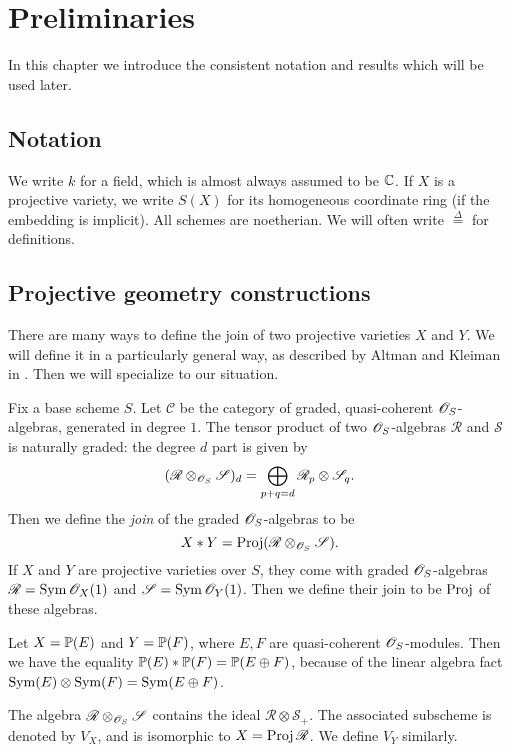 \chapter{Preliminaries}
\label{sec:prelims}

In this chapter we introduce the consistent notation and results which will be used later.


\section{Notation}

We write $k$ for a field, which is almost always assumed to be $\C$. If $X$ is a projective variety, we write $S(X)$ for its homogeneous coordinate ring (if the embedding is implicit). All schemes are noetherian. We will often write $\stackrel \Delta = $ for definitions.

\section{Projective geometry constructions}

There are many ways to define the join of two projective varieties $X$ and $Y$. We will define it in a particularly general way, as described by Altman and Kleiman in \cite{altman_joins}. Then we will specialize to our situation.

Fix a base scheme $S$. Let $\mathscr C$ be the category of graded, quasi-coherent $\OO_S$-algebras, generated in degree $1$. The tensor product of two $\OO_S$-algebras $\mathscr R$ and $\mathscr S$  is naturally graded: the degree $d$ part is given by
\[
(\mathscr R \otimes_{\OO_S} \mathscr S)_d = \bigoplus_{p+q=d} \mathscr R_p \otimes \mathscr S_q.
\]
Then we define the \emph{join} of the graded $\OO_S$-algebras to be
\[
X \ast Y = \Proj (\mathscr R \otimes_{\OO_S} \mathscr S).
\]
If $X$ and $Y$ are projective varieties over $S$, they come with graded $\OO_S$-algebras $\mathscr R = \Sym \OO_X(1)$ and $\mathscr S = \Sym \OO_Y(1)$. Then we define their join to be $\Proj$ of these algebras. 

\begin{example}
Let $X=\P(E)$ and $Y=\P(F)$, where $E,F$ are quasi-coherent $\OO_S$-modules. Then we have the equality $\P(E) \ast \P(F) = \P(E \oplus F)$, because of the linear algebra fact $\Sym(E) \otimes \Sym(F) = \Sym(E \oplus F)$.
\end{example}

The algebra $\mathscr R \otimes_{\OO_S} \mathscr S$ contains the ideal $\mathscr R \otimes \mathscr S_+$. The associated subscheme is denoted by $V_X$, and is isomorphic to $X = \Proj \mathscr R$. We define $V_Y$ similarly.

